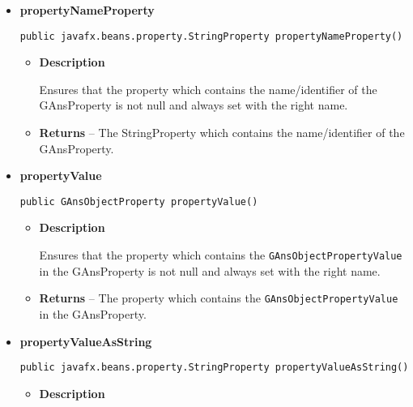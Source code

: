 {{{{{{\begin{itemize}
{\begin{itemize}
{Returns the string-representation of the \texttt{\small GAnsObjectPropertyValue}{\small 
{}} from the GAnsProperty.
}
\item{{\bf  Returns} -- 
The string-representation of the \texttt{\small GAnsObjectPropertyValue}{\small 
{}} from the GAnsProperty. 
}%
\end{itemize}
}%
\item{ 
{\bf  propertyNameProperty}\\
\begin{lstlisting}[frame=none]
public javafx.beans.property.StringProperty propertyNameProperty()\end{lstlisting} %
\begin{itemize}
\item{
{\bf  Description}

Ensures that the property which contains the name/identifier of the GAnsProperty is not null and always set with the right name.
}
\item{{\bf  Returns} -- 
The StringProperty which contains the name/identifier of the GAnsProperty. 
}%
\end{itemize}
}%
\item{ 
{\bf  propertyValue}\\
\begin{lstlisting}[frame=none]
public GAnsObjectProperty propertyValue()\end{lstlisting} %
\begin{itemize}
\item{
{\bf  Description}

Ensures that the property which contains the \texttt{\small GAnsObjectPropertyValue}{\small 
{}} in the GAnsProperty is not null and always set with the right name.
}
\item{{\bf  Returns} -- 
The property which contains the \texttt{\small GAnsObjectPropertyValue}{\small 
{}} in the GAnsProperty. 
}%
\end{itemize}
}%
\item{ 
{\bf  propertyValueAsString}\\
\begin{lstlisting}[frame=none]
public javafx.beans.property.StringProperty propertyValueAsString()\end{lstlisting} %
\begin{itemize}
\item{
{\bf  Description}

}
\end{itemize}}
\end{itemize}}}}}}}
